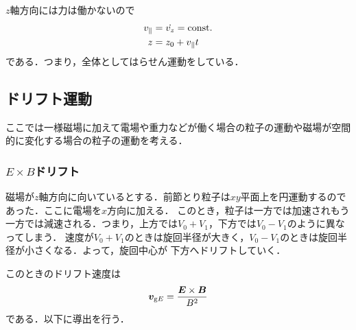 \documentclass{report}
\begin{document}
      $z$軸方向には力は働かないので
      \begin{align}
        v_{\parallel} &= \dot{v_z} = \mathrm{const.}\\
        z &= z_0 + v_{\parallel}t
      \end{align}
      である．つまり，全体としてはらせん運動をしている．

    \subsection{ドリフト運動}
      
      ここでは一様磁場に加えて電場や重力などが働く場合の粒子の運動や磁場が空間的に変化する場合の粒子の運動を考える．

      \subsubsection{$E\times B$ドリフト}
        磁場が$z$軸方向に向いているとする．前節とり粒子は$xy$平面上を円運動するのであった．ここに電場を$x$方向に加える．
        このとき，粒子は一方では加速されもう一方では減速される．つまり，上方では$V_0+V_1$，下方では$V_0-V_1$のように異なってしまう．
        速度が$V_0+V_1$のときは旋回半径が大きく，$V_0-V_1$のときは旋回半径が小さくなる．よって，旋回中心が
        下方へドリフトしていく．

        このときのドリフト速度は
        \begin{align}
          \bm{v}_{\mathrm{g}E} = \frac{\bm{E}\times\bm{B}}{B^2} 
        \end{align}
        である．以下に導出を行う．
        
\end{document}
